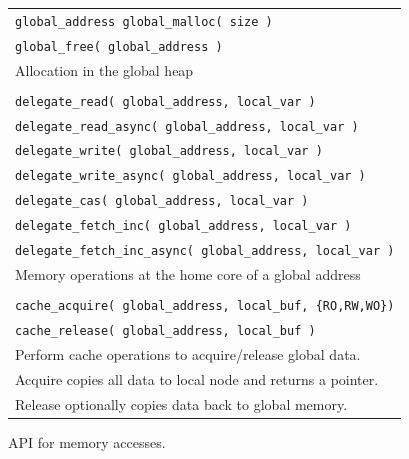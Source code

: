 \begin{figure}[htbp]
  \begin{center}
    \begin{minipage}{\columnwidth}
	\small
	\begin{tabular}{l}
      	\texttt{\scriptsize global\_address global\_malloc( size )} \\
      	\texttt{\scriptsize global\_free( global\_address )} \\ 
      	Allocation in the global heap \\ \\
      	\texttt{\scriptsize delegate\_read( global\_address, local\_var )}  \\
      	\texttt{\scriptsize delegate\_read\_async( global\_address, local\_var )}  \\
      	\texttt{\scriptsize delegate\_write( global\_address, local\_var )} \\
      	\texttt{\scriptsize delegate\_write\_async( global\_address, local\_var )} \\
      	\texttt{\scriptsize delegate\_cas( global\_address, local\_var )} \\
      	\texttt{\scriptsize delegate\_fetch\_inc( global\_address, local\_var )} \\
      	\texttt{\scriptsize delegate\_fetch\_inc\_async( global\_address, local\_var )} \\ 
      	Memory operations at the home core of a global address \\ \\
      	\texttt{\scriptsize cache\_acquire( global\_address, local\_buf, \{RO,RW,WO\})} \\
      	\texttt{\scriptsize cache\_release( global\_address, local\_buf )} \\ 
		Perform cache operations to acquire/release global data.  \\
		Acquire copies all data to local node and returns a pointer. \\ 	
		Release optionally copies data back to global memory. \\
	\end{tabular}
      \caption{\label{fig:accessing-memory} \Grappa API for memory accesses.}     \end{minipage}
  \end{center}
\end{figure}

